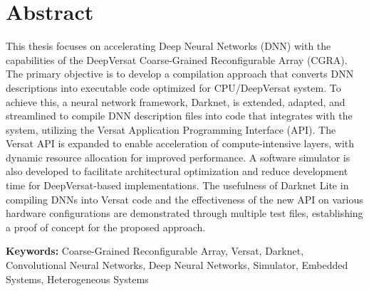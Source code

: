 
\section*{Abstract}



This thesis focuses on accelerating Deep Neural Networks (DNN) with the capabilities of the DeepVersat Coarse-Grained Reconfigurable Array (CGRA). The primary objective is to develop a compilation approach that converts DNN descriptions into executable code optimized for CPU/DeepVersat system. To achieve this, a neural network framework, Darknet, is extended, adapted, and streamlined to compile DNN description files into code that integrates with the system, utilizing the Versat Application Programming Interface (API). The Versat API is expanded to enable acceleration of compute-intensive layers, with dynamic resource allocation for improved performance. A software simulator is also developed to facilitate architectural optimization and reduce development time for DeepVersat-based implementations. 
The usefulness of Darknet Lite in compiling DNNs into Versat code and the effectiveness of the new API on various hardware configurations are demonstrated through multiple test files, establishing a proof of concept for the proposed approach.

\vfill

\textbf{\Large Keywords:} Coarse-Grained Reconfigurable Array, Versat, Darknet, Convolutional Neural Networks, Deep Neural Networks, Simulator, Embedded Systems, Heterogeneous Systems

